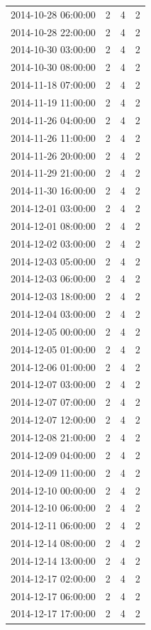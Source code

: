 \begin{tabular}{lrrr}
2014-10-28 06:00:00 & 2 & 4 & 2 \\
2014-10-28 22:00:00 & 2 & 4 & 2 \\
2014-10-30 03:00:00 & 2 & 4 & 2 \\
2014-10-30 08:00:00 & 2 & 4 & 2 \\
2014-11-18 07:00:00 & 2 & 4 & 2 \\
2014-11-19 11:00:00 & 2 & 4 & 2 \\
2014-11-26 04:00:00 & 2 & 4 & 2 \\
2014-11-26 11:00:00 & 2 & 4 & 2 \\
2014-11-26 20:00:00 & 2 & 4 & 2 \\
2014-11-29 21:00:00 & 2 & 4 & 2 \\
2014-11-30 16:00:00 & 2 & 4 & 2 \\
2014-12-01 03:00:00 & 2 & 4 & 2 \\
2014-12-01 08:00:00 & 2 & 4 & 2 \\
2014-12-02 03:00:00 & 2 & 4 & 2 \\
2014-12-03 05:00:00 & 2 & 4 & 2 \\
2014-12-03 06:00:00 & 2 & 4 & 2 \\
2014-12-03 18:00:00 & 2 & 4 & 2 \\
2014-12-04 03:00:00 & 2 & 4 & 2 \\
2014-12-05 00:00:00 & 2 & 4 & 2 \\
2014-12-05 01:00:00 & 2 & 4 & 2 \\
2014-12-06 01:00:00 & 2 & 4 & 2 \\
2014-12-07 03:00:00 & 2 & 4 & 2 \\
2014-12-07 07:00:00 & 2 & 4 & 2 \\
2014-12-07 12:00:00 & 2 & 4 & 2 \\
2014-12-08 21:00:00 & 2 & 4 & 2 \\
2014-12-09 04:00:00 & 2 & 4 & 2 \\
2014-12-09 11:00:00 & 2 & 4 & 2 \\
2014-12-10 00:00:00 & 2 & 4 & 2 \\
2014-12-10 06:00:00 & 2 & 4 & 2 \\
2014-12-11 06:00:00 & 2 & 4 & 2 \\
2014-12-14 08:00:00 & 2 & 4 & 2 \\
2014-12-14 13:00:00 & 2 & 4 & 2 \\
2014-12-17 02:00:00 & 2 & 4 & 2 \\
2014-12-17 06:00:00 & 2 & 4 & 2 \\
2014-12-17 17:00:00 & 2 & 4 & 2 \\

\end{tabular}
